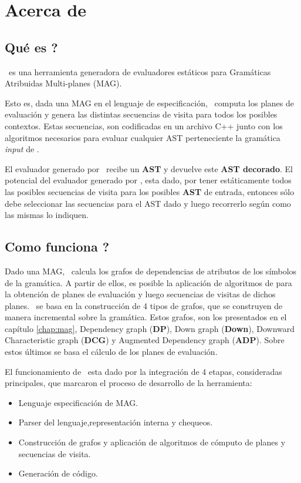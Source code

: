\chapter{Acerca de \maggen}
\label{chap:acercamaggen}
\minitoc

\section{\textquestiondown Qué es \maggen?}
\maggen\ es una herramienta generadora de evaluadores estáticos para Gramáticas Atribuidas Multi-planes (MAG). 

Esto es, dada una MAG en el lenguaje de especificación, \maggen\ computa los planes de evaluación y genera las distintas secuencias de visita para todos los posibles contextos. Estas secuencias, son codificadas en un archivo C++ junto con los algoritmos necesarios para evaluar cualquier AST perteneciente la gramática \textit{input} de \maggen.

El evaluador generado por \maggen\ recibe un \textbf{AST} y devuelve este \textbf{AST decorado}. El potencial del evaluador generado por \maggen, esta dado, por tener estáticamente todos las posibles secuencias de visita para los posibles \textbf{AST} de entrada, entonces sólo debe seleccionar las secuencias para el AST dado y luego recorrerlo según como las mismas lo indiquen.

\section{\textquestiondown Como funciona \maggen ?}
Dado una MAG, \maggen\ calcula los grafos de dependencias de atributos de los símbolos de la gramática. A partir de ellos, es posible la aplicación de algoritmos de para la obtención de planes de evaluación y luego secuencias de visitas de dichos planes. \maggen\ se basa en la construcción de 4 tipos de grafos, que se construyen de manera incremental sobre la gramática. Estos grafos, son los presentados en el capítulo \ref{chap:mag}, Dependency graph (\textbf{DP}), Down graph (\textbf{Down}), Downward Characteristic graph (\textbf{DCG}) y Augmented Dependency graph (\textbf{ADP}). Sobre estos últimos se basa el cálculo de los planes de evaluación.

El funcionamiento de \maggen\ esta dado por la integración de 4 etapas, consideradas principales, que marcaron el proceso de desarrollo de la herramienta:
\begin{itemize}
\item Lenguaje especificación de MAG.
\item Parser del lenguaje,representación interna y chequeos.
\item Construcción de grafos y aplicación de algoritmos de cómputo de planes y secuencias de visita.
\item Generación de código.
\end{itemize}


